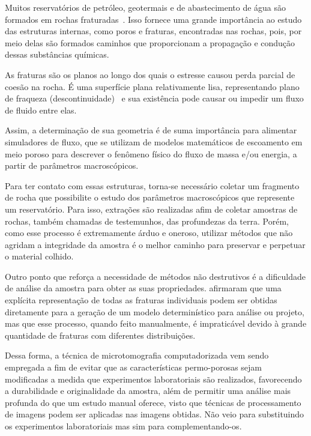 \documentclass[a4paper,10pt,twocolumn,twoside]{article}
\begin{document}
Muitos reservatórios de petróleo, geotermais e de abastecimento de água são formados em rochas fraturadas~\cite{national1996rock}. Isso fornece uma grande importância ao estudo das estruturas internas, como poros e fraturas, encontradas nas rochas, pois, por meio delas são formados caminhos que proporcionam a propagação e condução dessas substâncias químicas.


As fraturas são os planos ao longo dos quais o estresse causou perda parcial de coesão na rocha. É uma superfície plana relativamente lisa, representando
plano de fraqueza (descontinuidade)~\cite{singhal2010applied} e sua existência pode causar ou impedir um fluxo de fluido entre elas. 

Assim, a determinação de sua geometria é de suma importância para alimentar simuladores de fluxo, que se utilizam de modelos matemáticos de escoamento em meio poroso para descrever o fenômeno físico do fluxo de massa e/ou energia, a partir de parâmetros macroscópicos. 

Para ter contato com essas estruturas, torna-se necessário coletar um fragmento de rocha que possibilite o estudo dos parâmetros macroscópicos que represente um reservatório. Para isso, extrações são realizadas afim de coletar amostras de rochas, também chamadas de testemunhos, das profundezas da terra. Porém, como esse processo é extremamente árduo e oneroso, utilizar métodos que não agridam a integridade da amostra é o melhor caminho para preservar e perpetuar o material colhido.

Outro ponto que reforça a necessidade de métodos não destrutivos é a dificuldade de análise da amostra para obter as suas propriedades. \citet{jing2007fundamentals} afirmaram que uma explícita representação de todas as fraturas individuais podem ser obtidas diretamente para a geração de um modelo determinístico para análise ou projeto, mas que esse processo, quando feito manualmente, é impraticável devido à grande quantidade de fraturas com diferentes distribuições.

Dessa forma, a técnica de microtomografia computadorizada vem sendo empregada a fim de evitar que as características permo-porosas sejam modificadas a medida que experimentos laboratoriais são realizados, favorecendo a durabilidade e originalidade da amostra, além de permitir uma análise mais profunda do que um estudo manual oferece, visto que técnicas de processamento de imagens podem ser aplicadas nas imagens obtidas. Não veio para substituindo os experimentos laboratoriais mas sim para complementando-os.
\end{document}
